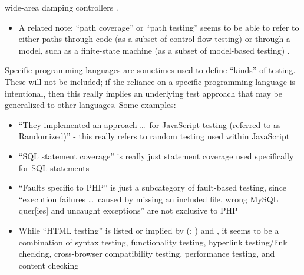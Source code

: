 \begin{enumerate}
            wide-area damping controllers \citep{PierreEtAl2017, TrudnowskiEtAl2017}.
            \begin{itemize}
                  \item A related note: ``path coverage'' or ``path testing''
                        seems to be able to refer to either paths through code
                        (as a subset of control-flow testing)
                        \citep[p.~5-13]{SWEBOK2024} or through a model, such as
                        a finite-state machine (as a subset of model-based
                        testing) \citep[p.~184]{DoğanEtAl2014}.
            \end{itemize}
            \fi
\end{enumerate}

\ifnotpaper
      Specific programming languages are sometimes used to define ``kinds'' of
      testing. These will not be included; if the reliance
      on a specific programming language is intentional, then this really implies an
      underlying test approach that may be generalized to other languages. Some
      examples:

      \begin{itemize}
            \item ``They implemented an approach \dots\ for JavaScript testing
                  (referred to as Randomized)'' \citep[p.~192]{DoğanEtAl2014} -
                  this really refers to random testing used within JavaScript
            \item ``SQL statement coverage'' is really just statement coverage
                  used specifically for SQL statements \citep[Tab.~13]{DoğanEtAl2014}
            \item ``Faults specific to PHP'' is just a subcategory of fault-based
                  testing, since ``execution failures \dots\ caused by missing an
                  included file, wrong MySQL quer[ies] and uncaught exceptions''
                  are not exclusive to PHP \citep[Tab.~27]{DoğanEtAl2014}
            \item While ``HTML testing'' is listed or implied by
                  \citeauthor{Gerrard2000a} (\citeyear[Tab.~2]{Gerrard2000a};
                  \citeyear[Tab.~1, p.~3]{Gerrard2000b}) and
                  \citet[p.~220]{Patton2006}, it seems to be a combination of syntax
                  testing, functionality testing, hyperlink testing/link checking,
                  cross-browser compatibility testing, performance testing, and
                  content checking \citep[p.~3]{Gerrard2000b}
      \end{itemize}

